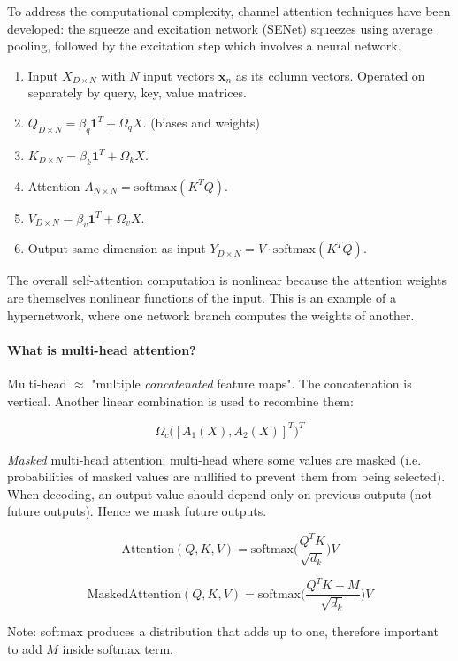 To address the computational complexity, channel attention techniques have been developed:
the squeeze and excitation network (SENet) squeezes using average pooling,
followed by the excitation step which involves a neural network.

\begin{enumerate}
    \item Input $X_{D \times N}$ with $N$ input vectors $\bm{x}_n$ as its column vectors. Operated on separately by query, key, value matrices.
    \item $Q_{D \times N} = \beta_q \bm{1}^T + \Omega_q X$. (biases and weights)
    \item $K_{D \times N} = \beta_k \bm{1}^T + \Omega_k X$.
    \item Attention $A_{N \times N} = \text{softmax}(K^T Q)$.
    \item $V_{D \times N} = \beta_v \bm{1}^T + \Omega_v X$.
    \item Output same dimension as input $Y_{D \times N} = V \cdot \text{softmax}(K^T Q)$.
\end{enumerate}

The overall self-attention  computation is nonlinear because the attention weights are themselves nonlinear functions of the input.
This is an example of a hypernetwork, where one network branch computes the weights of another.

\paragraph{What is multi-head attention?}

Multi-head $\approx$ "multiple \textit{concatenated} feature maps".
The concatenation is vertical. Another linear combination is used to recombine them:

$$\Omega_c \big( [ A_1(X), A_2(X) ]^T \big)^T$$

\textit{Masked} multi-head attention: multi-head where some values are masked
(i.e. probabilities of masked values are nullified to prevent them from being selected).
When decoding, an output value should depend only on previous outputs (not future outputs).
Hence we mask future outputs.

$$\text{Attention}(Q, K, V) = \text{softmax}\big(\frac{Q^T K}{\sqrt{d_k}}\big) V$$

$$\text{MaskedAttention}(Q, K, V) = \text{softmax}\big(\frac{Q^T K + M}{\sqrt{d_k}}\big) V$$

Note: softmax produces a distribution that adds up to one, therefore important to add $M$ inside softmax term.

